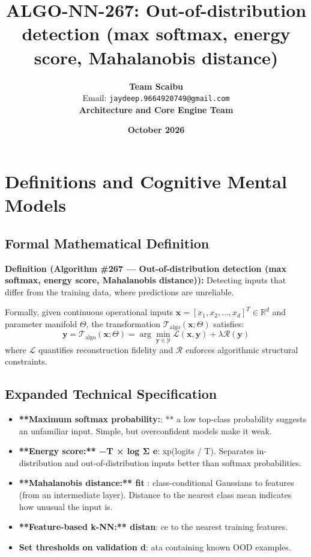 \documentclass[11pt,a4paper]{article}
\title{\textbf{ALGO-NN-267: Out-of-distribution detection (max softmax, energy score, Mahalanobis distance)}}
\author{\textbf{Team Scaibu} \\ \small Email: \texttt{jaydeep.9664920749@gmail.com} \\ \small \textbf{Architecture and Core Engine Team}}
\date{\textbf{October 2026}}
\theoremstyle{definition}
\begin{document}
\maketitle

\section{Definitions and Cognitive Mental Models}

\subsection{Formal Mathematical Definition}
\textbf{Definition (Algorithm \#267 --- Out-of-distribution detection (max softmax, energy score, Mahalanobis distance)):}
Detecting inputs that differ from the training data, where predictions are unreliable.

Formally, given continuous operational inputs $\mathbf{x} = [x_1, x_2, \dots, x_d]^T \in \mathbb{R}^d$ and parameter manifold $\Theta$, the transformation $\mathcal{T}_{\text{algo}}(\mathbf{x}; \Theta)$ satisfies:
{\boldmath
\begin{equation}
\mathbf{y} = \mathcal{T}_{\text{algo}}(\mathbf{x}; \Theta) = \arg\min_{\mathbf{y} \in \mathcal{Y}} \mathcal{L}(\mathbf{x}, \mathbf{y}) + \lambda \mathcal{R}(\mathbf{y})
\end{equation}
}
where $\mathcal{L}$ quantifies reconstruction fidelity and $\mathcal{R}$ enforces algorithmic structural constraints.

\subsection{Expanded Technical Specification}
\begin{itemize}
\item \textbf{**Maximum softmax probability:}: ** a low top-class probability suggests an unfamiliar input. Simple, but overconfident models make it weak.
\item \textbf{**Energy score:** −T × log Σ e}: xp(logits / T). Separates in-distribution and out-of-distribution inputs better than softmax probabilities.
\item \textbf{**Mahalanobis distance:** fit }: class-conditional Gaussians to features (from an intermediate layer). Distance to the nearest class mean indicates how unusual the input is.
\item \textbf{**Feature-based k-NN:** distan}: ce to the nearest training features.
\item \textbf{Set thresholds on validation d}: ata containing known OOD examples.
\end{itemize}
\end{document}
